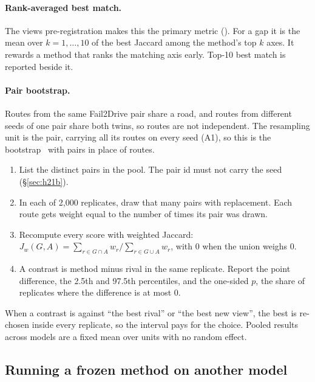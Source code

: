 \paragraph{Rank-averaged best match.}
The views pre-registration makes this the primary metric
(). For a gap it is
the mean over $k=1,\dots,10$ of the best Jaccard among the method's top $k$
axes. It rewards a method that ranks the matching axis early. Top-10 best match
is reported beside it.

\paragraph{Pair bootstrap.}
Routes from the same Fail2Drive pair share a road, and routes from different
seeds of one pair share both twins, so routes are not independent. The resampling
unit is the pair, carrying all its routes on every seed (A1), so this is the
bootstrap~\cite{efron1979bootstrap} with pairs in place of routes.
\begin{enumerate}
  \item List the distinct pairs in the pool. The pair id must not carry the seed
        (\S\ref{sec:h21b}).
  \item In each of 2{,}000 replicates, draw that many pairs with replacement.
        Each route gets weight equal to the number of times its pair was drawn.
  \item Recompute every score with weighted Jaccard:
        $J_w(G,A) = \sum_{r \in G \cap A} w_r \big/ \sum_{r \in G \cup A} w_r$,
        with 0 when the union weighs 0.
  \item A contrast is method minus rival in the same replicate. Report the point
        difference, the 2.5th and 97.5th percentiles, and the one-sided $p$, the
        share of replicates where the difference is at most 0.
\end{enumerate}
When a contrast is against ``the best rival'' or ``the best new view'', the best
is re-chosen inside every replicate, so the interval pays for the choice. Pooled
results across models are a fixed mean over units with no random effect.

\subsection{Running a frozen method on another model}
\label{sec:transfer}

